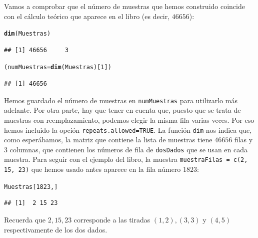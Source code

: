 \documentclass[10pt,a4paper]{article}\usepackage[]{graphicx}\usepackage[]{color}
\makeatletter
\newcommand{\hlnum}[1]{\textcolor[rgb]{0.686,0.059,0.569}{#1}}%
\newcommand{\hlstd}[1]{\textcolor[rgb]{0.345,0.345,0.345}{#1}}%
\newcommand{\hlkwb}[1]{\textcolor[rgb]{0.69,0.353,0.396}{#1}}%
\newcommand{\hlkwd}[1]{\textcolor[rgb]{0.737,0.353,0.396}{\textbf{#1}}}%
\newenvironment{kframe}{%
 \def\at@end@of@kframe{}%
 \ifinner\ifhmode%
  \def\at@end@of@kframe{\end{minipage}}%
  \begin{minipage}{\columnwidth}%
 \fi\fi%
 \def\FrameCommand##1{\hskip\@totalleftmargin \hskip-\fboxsep
 \colorbox{shadecolor}{##1}\hskip-\fboxsep
     \hskip-\linewidth \hskip-\@totalleftmargin \hskip\columnwidth}%
 \MakeFramed {\advance\hsize-\width
   \@totalleftmargin\z@ \linewidth\hsize
   \@setminipage}}%
 {\par\unskip\endMakeFramed%
 \at@end@of@kframe}
\newenvironment{knitrout}{}{} %
\newcounter {cont01}
\makeatother
\begin{document}
Vamos a comprobar que el número de muestras que hemos construido coincide con el cálculo teórico que aparece en el libro (es decir, $46656$):
\begin{knitrout}
\color{fgcolor}\begin{kframe}
\begin{alltt}
\hlkwd{dim}\hlstd{(Muestras)}
\end{alltt}
\begin{verbatim}
## [1] 46656     3
\end{verbatim}
\begin{alltt}
\hlstd{(numMuestras} \hlkwb{=} \hlkwd{dim}\hlstd{(Muestras)[}\hlnum{1}\hlstd{])}
\end{alltt}
\begin{verbatim}
## [1] 46656
\end{verbatim}
\end{kframe}
\end{knitrout}
Hemos guardado el número de muestras en {\tt numMuestras} para utilizarlo más adelante. Por otra parte, hay que tener en cuenta que, puesto que se trata de muestras con reemplazamiento, podemos elegir la misma fila varias veces. Por eso hemos incluido la opción {\tt repeats.allowed=TRUE}. La función {\tt dim} nos indica que, como esperábamos, la matriz que contiene la lista de muestras tiene $46656$ filas y $3$ columnas, que contienen los números de fila de {\tt dosDados} que se usan en cada muestra. Para seguir con el ejemplo del libro, la muestra {\tt muestraFilas = c(2, 15, 23)} que hemos usado antes aparece en la fila número $1823$:
\begin{knitrout}
\color{fgcolor}\begin{kframe}
\begin{alltt}
\hlstd{Muestras[}\hlnum{1823}\hlstd{, ]}
\end{alltt}
\begin{verbatim}
## [1]  2 15 23
\end{verbatim}
\end{kframe}
\end{knitrout}
Recuerda que $2, 15, 23$ corresponde a las tiradas $(1,2), (3, 3)$ y $(4, 5)$ respectivamente de los dos dados.
\end{document}
